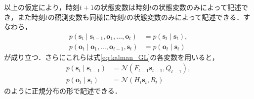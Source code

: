         以上の仮定により，時刻$t+1$の状態変数は時刻$t$の状態変数のみによって記述でき，また時刻$t$の観測変数も同様に時刻$t$の状態変数のみによって記述できる．すなわち，
        \begin{equation}
            \label{eq:kalman_with_markov}
            \begin{aligned}
                p(\bm{s}_{t} \mid \bm{s}_{t-1}, \bm{o}_1, \dots, \bm{o}_t) &= p(\bm{s}_t \mid \bm{s}_t),
                \\p(\bm{o}_t \mid \bm{o}_1, \dots, \bm{o}_{t-1}, \bm{s}_t) &= p(\bm{o}_t \mid \bm{s}_t)
            \end{aligned}
        \end{equation}
        が成り立つ．さらにこれらは式\ref{eq:kalman_GL}の各変数を用いると，
        \begin{equation}
            \label{eq:linear_transition_and_observation}
            \begin{aligned}
                p(\bm{s}_t \mid \bm{s}_{t-1}) &= \mathcal{N}(F_{t-1} \bm{s}_{t-1}, Q_{t-1}),
                \\ p(\bm{o}_t \mid \bm{s}_t) &= \mathcal{N}(H_t \bm{s}_{t}, R_t)
            \end{aligned}
        \end{equation}
        のように正規分布の形で記述できる．

